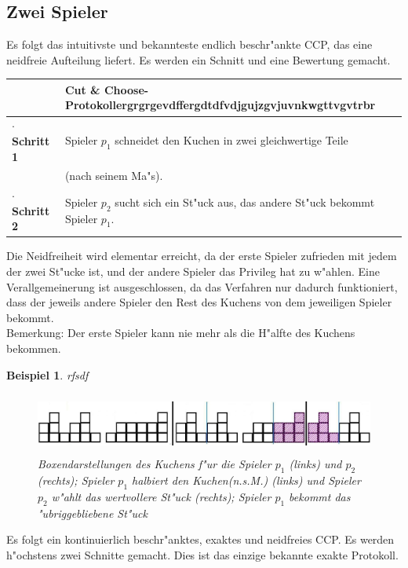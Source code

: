 \documentclass[11pt, a4paper, twoside]{article}
\newcommand{\wf}{\color{white}}
\newcommand{\tf}{\color{black}}
\newtheorem{bsp}[satz]{Beispiel}
\numberwithin{equation}{section}
\begin{document}
\subsection{Zwei Spieler}
Es folgt das intuitivste und bekannteste endlich beschr"ankte CCP, das eine neidfreie Aufteilung liefert. Es werden ein Schnitt und eine Bewertung gemacht.\\
\newline
\begin{tabular}{|ll|}
\hline
&\textbf{Cut \& Choose-Protokoll}\wf ergrgrgevdffergdtdfvdjgujzgvjuvnkwgttvgvtrbr\tf\\
\hline
\textbf{$\cdot$ Schritt 1}&Spieler $p_1$ schneidet den Kuchen in zwei gleichwertige Teile\\&(nach seinem Ma"s).\\
\textbf{$\cdot$ Schritt 2}&Spieler $p_2$ sucht sich ein St"uck aus, das andere St"uck bekommt Spieler $p_1$.\\
\hline
\end{tabular}
\newline
\newline
\newline
Die Neidfreiheit wird elementar erreicht, da der erste Spieler zufrieden mit jedem der zwei St"ucke ist, und der andere Spieler das Privileg hat zu w"ahlen. Eine Verallgemeinerung ist ausgeschlossen, da das Verfahren nur dadurch funktioniert, dass der jeweils andere Spieler den Rest des Kuchens von dem jeweiligen Spieler bekommt.\\Bemerkung: Der erste Spieler kann nie mehr als die H"alfte des Kuchens bekommen.
\begin{bsp}\wf rfsdf
\begin{figure}[h!]
\includegraphics[height=2cm]{cc3.jpg}
\caption[Beispiel zum Cut \& Choose-Protokoll]{Boxendarstellungen des Kuchens f"ur die Spieler $p_1$ (links) und $p_2$ (rechts); Spieler $p_1$ halbiert den Kuchen(n.s.M.) (links) und Spieler $p_2$ w"ahlt das wertvollere St"uck (rechts); Spieler $p_1$ bekommt das "ubriggebliebene St"uck}
\end{figure}
\end{bsp}
Es folgt ein kontinuierlich beschr"anktes, exaktes und neidfreies CCP. Es werden h"ochstens zwei Schnitte gemacht. Dies ist das einzige bekannte exakte Protokoll.\\
\end{document}
